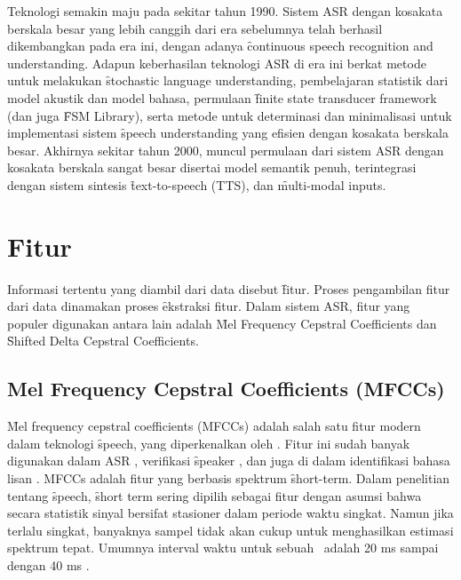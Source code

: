 Teknologi semakin maju pada sekitar tahun 1990. Sistem ASR dengan kosakata berskala besar yang lebih canggih dari era sebelumnya telah berhasil dikembangkan pada era ini, dengan adanya \f{continuous speech recognition and understanding}. Adapun keberhasilan teknologi ASR di era ini berkat metode untuk melakukan \f{stochastic language understanding}, pembelajaran statistik dari model akustik dan model bahasa, permulaan \f{finite state transducer framework} (dan juga \f{FSM Library}), serta metode untuk determinasi dan minimalisasi untuk implementasi sistem \f{speech understanding} yang efisien dengan kosakata berskala besar. Akhirnya sekitar tahun 2000, muncul permulaan dari sistem ASR dengan kosakata berskala sangat besar disertai model semantik penuh, terintegrasi dengan sistem sintesis \f{text-to-speech} (TTS), dan \f{multi-modal inputs}.



\section{Fitur}
Informasi tertentu yang diambil dari data disebut \f{fitur}. Proses pengambilan fitur dari data dinamakan proses \f{ekstraksi fitur}. Dalam sistem ASR, fitur yang populer digunakan antara lain adalah \f{Mel Frequency Cepstral Coefficients} dan \f{Shifted Delta Cepstral Coefficients}.

	\subsection{Mel Frequency Cepstral Coefficients (MFCCs)} \label{teorimfcc}
	\f{Mel frequency cepstral coefficients} (MFCCs) adalah salah satu fitur modern dalam teknologi \f{speech}, yang diperkenalkan oleh \cite{1163420}. Fitur ini sudah banyak digunakan dalam ASR \citep{young2002htk}, verifikasi \f{speaker} \citep{ganchev2005comparative}, dan juga di dalam identifikasi bahasa lisan \citep{yin2006combining}. MFCCs adalah fitur yang berbasis spektrum \f{short-term}. Dalam penelitian tentang \f{speech}, \f{short term} sering dipilih sebagai fitur dengan asumsi bahwa secara statistik sinyal bersifat stasioner dalam periode waktu singkat. Namun jika terlalu singkat, banyaknya sampel tidak akan cukup untuk menghasilkan estimasi spektrum tepat. Umumnya interval waktu untuk sebuah \fr~adalah 20 ms sampai dengan 40 ms \citep{zahra2013unique}.


